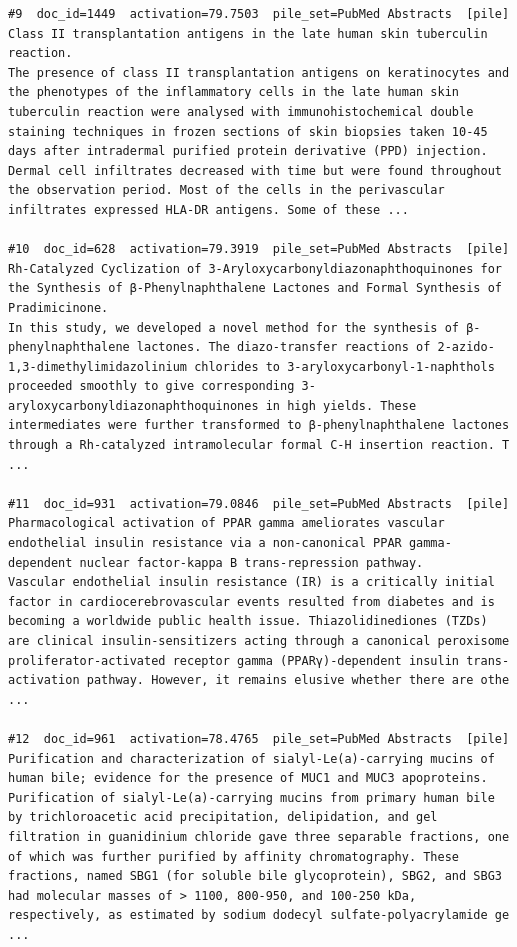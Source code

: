 \begin{verbatim}
#9  doc_id=1449  activation=79.7503  pile_set=PubMed Abstracts  [pile]
Class II transplantation antigens in the late human skin tuberculin reaction.
The presence of class II transplantation antigens on keratinocytes and the phenotypes of the inflammatory cells in the late human skin tuberculin reaction were analysed with immunohistochemical double staining techniques in frozen sections of skin biopsies taken 10-45 days after intradermal purified protein derivative (PPD) injection. Dermal cell infiltrates decreased with time but were found throughout the observation period. Most of the cells in the perivascular infiltrates expressed HLA-DR antigens. Some of these ...

#10  doc_id=628  activation=79.3919  pile_set=PubMed Abstracts  [pile]
Rh-Catalyzed Cyclization of 3-Aryloxycarbonyldiazonaphthoquinones for the Synthesis of β-Phenylnaphthalene Lactones and Formal Synthesis of Pradimicinone.
In this study, we developed a novel method for the synthesis of β-phenylnaphthalene lactones. The diazo-transfer reactions of 2-azido-1,3-dimethylimidazolinium chlorides to 3-aryloxycarbonyl-1-naphthols proceeded smoothly to give corresponding 3-aryloxycarbonyldiazonaphthoquinones in high yields. These intermediates were further transformed to β-phenylnaphthalene lactones through a Rh-catalyzed intramolecular formal C-H insertion reaction. T ...

#11  doc_id=931  activation=79.0846  pile_set=PubMed Abstracts  [pile]
Pharmacological activation of PPAR gamma ameliorates vascular endothelial insulin resistance via a non-canonical PPAR gamma-dependent nuclear factor-kappa B trans-repression pathway.
Vascular endothelial insulin resistance (IR) is a critically initial factor in cardiocerebrovascular events resulted from diabetes and is becoming a worldwide public health issue. Thiazolidinediones (TZDs) are clinical insulin-sensitizers acting through a canonical peroxisome proliferator-activated receptor gamma (PPARγ)-dependent insulin trans-activation pathway. However, it remains elusive whether there are othe ...

#12  doc_id=961  activation=78.4765  pile_set=PubMed Abstracts  [pile]
Purification and characterization of sialyl-Le(a)-carrying mucins of human bile; evidence for the presence of MUC1 and MUC3 apoproteins.
Purification of sialyl-Le(a)-carrying mucins from primary human bile by trichloroacetic acid precipitation, delipidation, and gel filtration in guanidinium chloride gave three separable fractions, one of which was further purified by affinity chromatography. These fractions, named SBG1 (for soluble bile glycoprotein), SBG2, and SBG3 had molecular masses of > 1100, 800-950, and 100-250 kDa, respectively, as estimated by sodium dodecyl sulfate-polyacrylamide ge ...


\end{verbatim}
